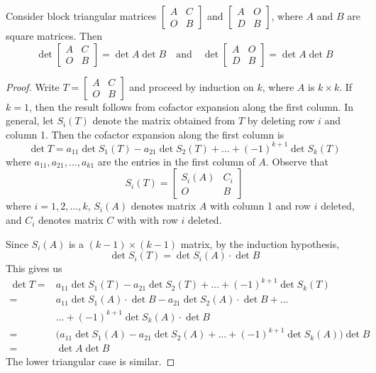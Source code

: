 \documentclass{ximera}
\begin{document}
 \begin{theorem}\label{th:blockTriDet}
     Consider block triangular matrices $\begin{bmatrix}A & C\\O& B\end{bmatrix}$ and $\begin{bmatrix}A & O\\D& B\end{bmatrix}$, where $A$ and $B$ are square matrices.  Then
     $$\det{\begin{bmatrix}A & C\\O& B\end{bmatrix}}=\det{A}\det{B}\quad\mbox{and}\quad\det{\begin{bmatrix}A & O\\D& B\end{bmatrix}}=\det{A}\det{B}$$
 \end{theorem}
\begin{proof}
    Write $T=\begin{bmatrix}A & C\\O& B\end{bmatrix}$ and proceed by induction on $k$, where $A$ is $k\times k$.  If $k=1$, then the result follows from cofactor expansion along the first column.  In general, let $S_i(T)$ denote the matrix obtained from $T$ by deleting row $i$ and column 1. Then the cofactor expansion along the first column is
    $$\det{T}=a_{11}\det{S_1(T)}-a_{21}\det{S_2(T)}+\dots + (-1)^{k+1}\det{S_k(T)}$$
    where $a_{11}, a_{21},\dots , a_{k1}$ are the entries in the first column of $A$.  Observe that 
    $$S_i(T)=\begin{bmatrix}S_i(A) & C_i\\O& B\end{bmatrix}$$
    where $i=1,2,\dots , k$, $S_i(A)$ denotes matrix $A$ with column 1 and row $i$ deleted, and $C_i$ denotes matrix $C$ with with row $i$ deleted.
    
    Since $S_i(A)$ is a $(k-1)\times (k-1)$ matrix, by the induction hypothesis,
    $$\det{S_i(T)}=\det{S_i(A)}\cdot \det{B}$$
    This gives us
    \begin{align*}
        \det{T}=&a_{11}\det{S_1(T)}-a_{21}\det{S_2(T)}+\dots + (-1)^{k+1}\det{S_k(T)}\\
        =&a_{11}\det{S_1(A)}\cdot\det{B}-a_{21}\det{S_2(A)}\cdot\det{B}+\dots \\
        &\dots+ (-1)^{k+1}\det{S_k(A)}\cdot\det{B}\\
        =&\Big(a_{11}\det{S_1(A)}-a_{21}\det{S_2(A)}+\dots + (-1)^{k+1}\det{S_k(A)}\Big)\det{B}\\
        =&\det{A}\det{B}
    \end{align*}
    The lower triangular case is similar.
\end{proof}
\end{document}
